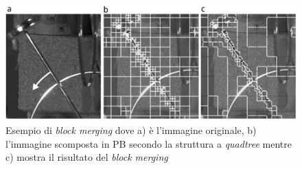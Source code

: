 \begin{figure}[H]
  \centering
  \captionsetup{justification=raggedright}
  \includegraphics[scale=0.30]{Figures/Block_merging}
  \caption[Esempio di \emph{block merging}]
          {Esempio di \emph{block merging} dove a) è l'immagine originale, b)
           l'immagine scomposta in PB secondo la struttura a \emph{quadtree}
           mentre c) mostra il risultato del \emph{block merging}}
\end{figure}
\newpage
